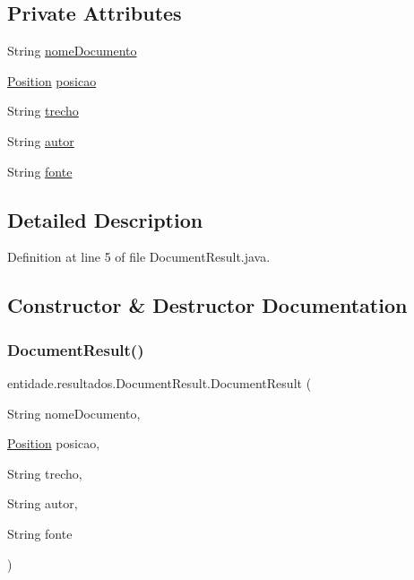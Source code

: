 \subsection*{Private Attributes}
\begin{DoxyCompactItemize}
\item 
String \hyperlink{classentidade_1_1resultados_1_1DocumentResult_ad7a0e1860d8f76fc15d65dab6cec9ac7}{nome\+Documento}
\item 
\hyperlink{classentidade_1_1Position}{Position} \hyperlink{classentidade_1_1resultados_1_1DocumentResult_af0690de1fbdf3817b5a534754656f156}{posicao}
\item 
String \hyperlink{classentidade_1_1resultados_1_1DocumentResult_ad6290fdc6352643297775c26d098003b}{trecho}
\item 
String \hyperlink{classentidade_1_1resultados_1_1DocumentResult_a3b075228042908bf76793f2bf7f8bdf3}{autor}
\item 
String \hyperlink{classentidade_1_1resultados_1_1DocumentResult_ad7180ea32ea41099262d5ca323fa7aa4}{fonte}
\end{DoxyCompactItemize}


\subsection{Detailed Description}


Definition at line 5 of file Document\+Result.\+java.



\subsection{Constructor \& Destructor Documentation}
\hypertarget{classentidade_1_1resultados_1_1DocumentResult_acadb0a005ce6c47313c1dbde300ecdb0}{}\label{classentidade_1_1resultados_1_1DocumentResult_acadb0a005ce6c47313c1dbde300ecdb0} 
\subsubsection{\texorpdfstring{Document\+Result()}{DocumentResult()}\hspace{0.1cm}{\footnotesize\ttfamily [1/3]}}
{\footnotesize\ttfamily entidade.\+resultados.\+Document\+Result.\+Document\+Result (\begin{DoxyParamCaption}\item[{String}]{nome\+Documento,  }\item[{\hyperlink{classentidade_1_1Position}{Position}}]{posicao,  }\item[{String}]{trecho,  }\item[{String}]{autor,  }\item[{String}]{fonte }\end{DoxyParamCaption})}



